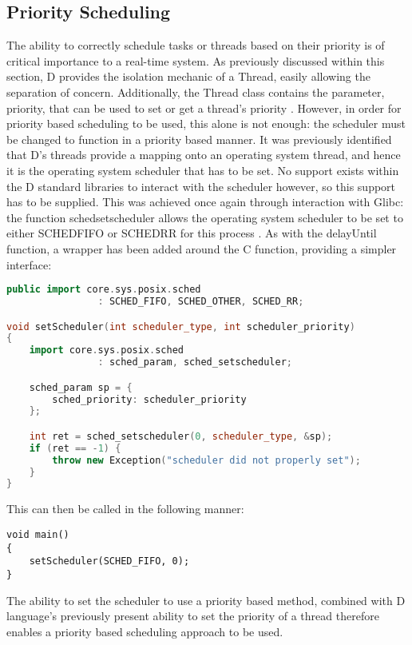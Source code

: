 \subsection{Priority Scheduling}
The ability to correctly schedule tasks or threads based on their priority is of 
critical importance to a real-time system. As previously discussed within this 
section, D provides the isolation mechanic of a Thread, easily allowing the 
separation of concern. Additionally, the Thread class contains the parameter, 
priority, that can be used to set or get a thread's priority
\cite{core-thread}. 
However, in order for priority based scheduling to be used, this alone is not 
enough: the scheduler must be changed to function in a priority based manner. 
It was previously identified that D's threads provide a mapping onto an operating  
system thread, and hence it is the operating system scheduler that has to be set.  
No support exists within the D standard libraries to interact with the scheduler 
however, so this support has to be supplied. 
This was achieved once again through interaction with Glibc: the function 
sched\textunderscore{}setscheduler allows the operating system scheduler to 
be set to either SCHED\textunderscore{}FIFO or SCHED\textunderscore{}RR for 
this process
\cite{sched-setscheduler}. 
As with the delayUntil function, a wrapper has been added around the C function,
providing a simpler interface: 
\begin{lstlisting}[language=C++]
public import core.sys.posix.sched 
                : SCHED_FIFO, SCHED_OTHER, SCHED_RR; 

void setScheduler(int scheduler_type, int scheduler_priority)
{
    import core.sys.posix.sched 
                : sched_param, sched_setscheduler; 

    sched_param sp = { 
        sched_priority: scheduler_priority 
    }; 

    int ret = sched_setscheduler(0, scheduler_type, &sp); 
    if (ret == -1) {
        throw new Exception("scheduler did not properly set");
    }
}
\end{lstlisting}
This can then be called in the following manner: 
\begin{lstlisting}
void main()
{
    setScheduler(SCHED_FIFO, 0); 
}
\end{lstlisting}
The ability to set the scheduler to use a priority based method, combined with 
D language's previously present ability to set the priority of a thread therefore 
enables a priority based scheduling approach to be used.  


